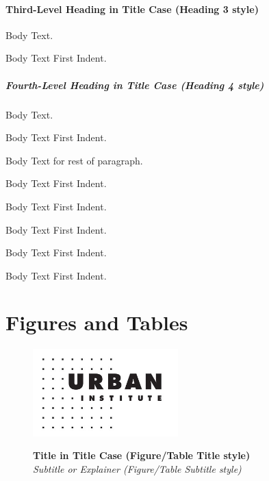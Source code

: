 \subsection{Third-Level Heading in Title Case (Heading 3 style)}
Body Text.

Body Text First Indent.

\subsubsection{Fourth-Level Heading in Title Case (Heading 4 style)}
Body Text.

Body Text First Indent.


\noindent Body Text for rest of paragraph.

Body Text First Indent. 

Body Text First Indent. 


Body Text First Indent.

Body Text First Indent.

Body Text First Indent.

\newpage
\part{Figures and Tables}

\begin{figure}[htbp]
    \caption{
    \textbf{Title in Title Case (Figure/Table Title style)}\\
    \textit{Subtitle or Explainer (Figure/Table Subtitle style)}
    }
    \centering
    \includegraphics[width=0.5\textwidth]{images/logo-bw.jpg}
    \label{fig:my_label}
\end{figure}
\begin{singlespace}
    \\
\end{singlespace}

